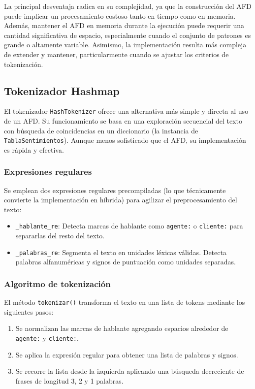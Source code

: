 La principal desventaja radica en su complejidad, ya que la construcción del AFD puede implicar
un procesamiento costoso tanto en tiempo como en memoria. Además, mantener el AFD en memoria
durante la ejecución puede requerir una cantidad significativa de espacio, especialmente cuando
el conjunto de patrones es grande o altamente variable. Asimismo, la implementación resulta más
compleja de extender y mantener, particularmente cuando se ajustar los criterios de
tokenización.

\subsection{Tokenizador Hashmap}
El tokenizador \texttt{HashTokenizer} ofrece una alternativa más simple y directa al uso de un
AFD. Su funcionamiento se basa en una exploración secuencial del texto con búsqueda de
coincidencias en un diccionario (la instancia de \texttt{TablaSentimientos}). Aunque menos
sofisticado que el AFD, su implementación es rápida y efectiva.

\subsubsection{Expresiones regulares}
Se emplean dos expresiones regulares precompiladas (lo que técnicamente convierte la
implementación en híbrida) para agilizar el preprocesamiento del texto:

\begin{itemize}
	\item \texttt{\_hablante\_re}: Detecta marcas de hablante como \texttt{agente:} o
	      \texttt{cliente:} para separarlas del resto del texto.

	\item \texttt{\_palabras\_re}: Segmenta el texto en unidades léxicas válidas. Detecta
	      palabras alfanuméricas y signos de puntuación como unidades separadas.
\end{itemize}

\subsubsection{Algoritmo de tokenización}
El método \texttt{tokenizar()} transforma el texto en una lista de tokens mediante los
siguientes pasos:

\begin{enumerate}
	\item Se normalizan las marcas de hablante agregando espacios alrededor de \texttt{agente:}
	      y \texttt{cliente:}.

	\item Se aplica la expresión regular para obtener una lista de palabras y signos.

	\item Se recorre la lista desde la izquierda aplicando una búsqueda decreciente de frases
	      de longitud 3, 2 y 1 palabras.
\end{enumerate}

